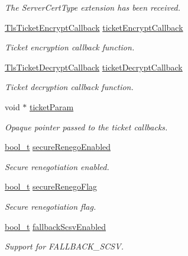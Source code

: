 \begin{DoxyCompactItemize}
\begin{DoxyCompactList}\small\item\em The Server\+Cert\+Type extension has been received. \end{DoxyCompactList}\item 
\hyperlink{tls_8h_a285a972f2c50b94aad3c1315595538ed}{Tls\+Ticket\+Encrypt\+Callback} \hyperlink{struct__TlsContext_aa2e3615e54b33683f6d151ec3da359cf}{ticket\+Encrypt\+Callback}
\begin{DoxyCompactList}\small\item\em Ticket encryption callback function. \end{DoxyCompactList}\item 
\hyperlink{tls_8h_aaa1312868adabe84a91c54f830669789}{Tls\+Ticket\+Decrypt\+Callback} \hyperlink{struct__TlsContext_a090b9f9cf093cae621d142c2a61227e1}{ticket\+Decrypt\+Callback}
\begin{DoxyCompactList}\small\item\em Ticket decryption callback function. \end{DoxyCompactList}\item 
void $\ast$ \hyperlink{struct__TlsContext_aea986fb507196f9c23b84cbcd096c1bd}{ticket\+Param}
\begin{DoxyCompactList}\small\item\em Opaque pointer passed to the ticket callbacks. \end{DoxyCompactList}\item 
\hyperlink{compiler__port_8h_a812d16e5494522586b3784e55d479912}{bool\+\_\+t} \hyperlink{struct__TlsContext_a9cf4eccb7f21850bb7b7729db1028463}{secure\+Renego\+Enabled}
\begin{DoxyCompactList}\small\item\em Secure renegotiation enabled. \end{DoxyCompactList}\item 
\hyperlink{compiler__port_8h_a812d16e5494522586b3784e55d479912}{bool\+\_\+t} \hyperlink{struct__TlsContext_a58218856798a20ca0406216f62970576}{secure\+Renego\+Flag}
\begin{DoxyCompactList}\small\item\em Secure renegotiation flag. \end{DoxyCompactList}\item 
\hyperlink{compiler__port_8h_a812d16e5494522586b3784e55d479912}{bool\+\_\+t} \hyperlink{struct__TlsContext_a35c046259280c78fe437b1c04310b547}{fallback\+Scsv\+Enabled}
\begin{DoxyCompactList}\small\item\em Support for F\+A\+L\+L\+B\+A\+C\+K\+\_\+\+S\+C\+SV. \end{DoxyCompactList}\item 

\end{DoxyCompactItemize}
